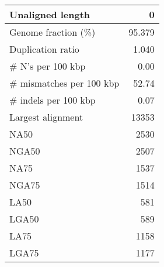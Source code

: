 \documentclass[12pt,a4paper]{article}
\begin{document}
\begin{table}[ht]
\begin{center}
\begin{tabular}{|l*{1}{|r}|}
Unaligned length & 0 \\ \hline
Genome fraction (\%) & 95.379 \\ \hline
Duplication ratio & 1.040 \\ \hline
\# N's per 100 kbp & 0.00 \\ \hline
\# mismatches per 100 kbp & 52.74 \\ \hline
\# indels per 100 kbp & 0.07 \\ \hline
Largest alignment & 13353 \\ \hline
NA50 & 2530 \\ \hline
NGA50 & 2507 \\ \hline
NA75 & 1537 \\ \hline
NGA75 & 1514 \\ \hline
LA50 & 581 \\ \hline
LGA50 & 589 \\ \hline
LA75 & 1158 \\ \hline
LGA75 & 1177 \\ \hline
\end{tabular}
\end{center}
\end{table}
\end{document}
